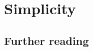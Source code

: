 \chapter{Simplicity}


\noindent

\section{Further reading}

\nocite{Solomonoff:1964}


\endinput



